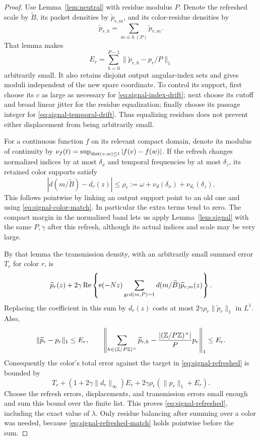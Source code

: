 \begin{proof}
Use Lemma~\ref{lem:neutral} with residue modulus $P$.  Denote the
refreshed scale by $\widetilde B$, its packet densities by
$\widetilde p_{r,m}$, and its color-residue densities by
\[
 \widetilde p_{r,h}=\sum_{m\equiv h\ (P)}\widetilde p_{r,m}.
\]
That lemma makes
\begin{equation}
 E_r=\sum_{h=0}^{P-1}
       \|\widetilde p_{r,h}-p_r/P\|_1
 \label{eq:signal-residue-error}
\end{equation}
arbitrarily small.  It also retains disjoint output angular-index
sets and gives moduli independent of the new spare coordinate.
To control its support, first choose its $c$ as large as necessary
for \eqref{eq:signal-index-drift}; next choose its cutoff and broad
linear jitter for the residue equalization; finally choose its passage
integer for \eqref{eq:signal-temporal-drift}.  Thus equalizing residues
does not prevent either displacement from being arbitrarily small.

For a continuous function $f$ on its relevant compact domain, denote
its modulus of continuity by
$\nu_f(t)=\sup_{\operatorname{dist}(v,w)\le t}|f(v)-f(w)|$.
If the refresh changes normalized indices by at most $\delta_x$ and
temporal frequencies by at most $\delta_z$, its retained color
supports satisfy
\begin{equation}
 |d(m/\widetilde B)-d_r(z)|
 \le\rho_r:=\omega+\nu_d(\delta_x)+\nu_{d_r}(\delta_z).
 \label{eq:signal-refreshed-match}
\end{equation}
This follows pointwise by linking an output support point to an old
one and using \eqref{eq:signal-color-match}.  In particular the extra
terms tend to zero.  The compact margin in the normalized band lets
us apply Lemma~\ref{lem:signal} with the same $P,\gamma$ after this
refresh, although its actual indices and scale may be very large.

By that lemma the transmission density, with an arbitrarily small
summed error $T_r$ for color $r$, is
\[
 \widetilde p_r(z)+2\gamma\operatorname{Re}\left\{\operatorname{e}(-Nz)
    \sum_{\gcd(m,P)=1}d(m/\widetilde B)
                                   \widetilde p_{r,m}(z)\right\}.
\]
Replacing the coefficient in this sum by $d_r(z)$ costs at most
$2\gamma\rho_r\|\widetilde p_r\|_1$ in $L^1$.  Also,
\[
 \|\widetilde p_r-p_r\|_1\le E_r,
 \qquad
 \left\|\sum_{h\in(\mathbb Z/P\mathbb Z)^\times}\widetilde p_{r,h}
          -\frac{|(\mathbb Z/P\mathbb Z)^\times|}{P}p_r\right\|_1\le E_r.
\]
Consequently the color's total error against the target in
\eqref{eq:signal-refreshed} is bounded by
\begin{equation}
 T_r+(1+2\gamma\|d_r\|_\infty)E_r
       +2\gamma\rho_r(\|p_r\|_1+E_r).
 \label{eq:signal-refresh-error}
\end{equation}
Choose the refresh errors, displacements, and transmission errors
small enough and sum this bound over the finite list.  This proves
\eqref{eq:signal-refreshed}, including the exact value of $\lambda$.
Only residue balancing after summing over a color was needed, because
\eqref{eq:signal-refreshed-match} holds pointwise before the sum.


\end{proof}
